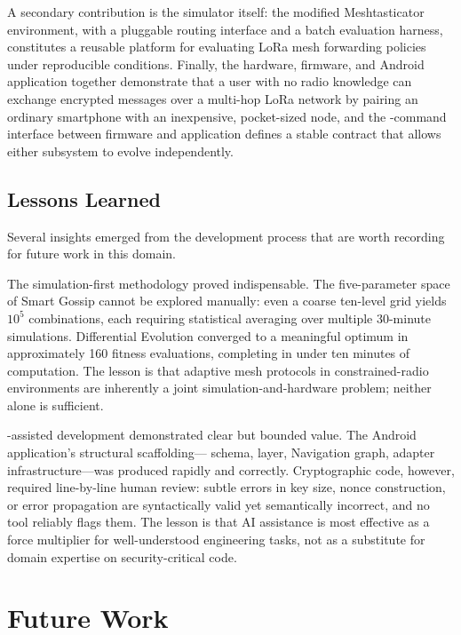 \documentclass[english,bachelor]{tfgitic}[2026/01/22]
\begin{document}
A secondary contribution is the simulator itself: the modified Meshtasticator environment, with a pluggable routing interface and a batch evaluation harness, constitutes a reusable platform for evaluating LoRa mesh forwarding policies under reproducible conditions. Finally, the hardware, firmware, and Android application together demonstrate that a user with no radio knowledge can exchange encrypted messages over a multi-hop LoRa network by pairing an ordinary smartphone with an inexpensive, pocket-sized node, and the -command interface between firmware and application defines a stable contract that allows either subsystem to evolve independently.

\section{Lessons Learned}

Several insights emerged from the development process that are worth recording for future work in this domain.

The simulation-first methodology proved indispensable. The five-parameter space of Smart Gossip cannot be explored manually: even a coarse ten-level grid yields $10^5$ combinations, each requiring statistical averaging over multiple 30-minute simulations. Differential Evolution converged to a meaningful optimum in approximately 160 fitness evaluations, completing in under ten minutes of computation. The lesson is that adaptive mesh protocols in constrained-radio environments are inherently a joint simulation-and-hardware problem; neither alone is sufficient.

-assisted development demonstrated clear but bounded value. The Android application's structural scaffolding--- schema,  layer, Navigation graph, adapter infrastructure---was produced rapidly and correctly. Cryptographic code, however, required line-by-line human review: subtle errors in key size, nonce construction, or error propagation are syntactically valid yet semantically incorrect, and no tool reliably flags them. The lesson is that AI assistance is most effective as a force multiplier for well-understood engineering tasks, not as a substitute for domain expertise on security-critical code.

\chapter{Future Work}
\label{ch:future_work}
\end{document}
